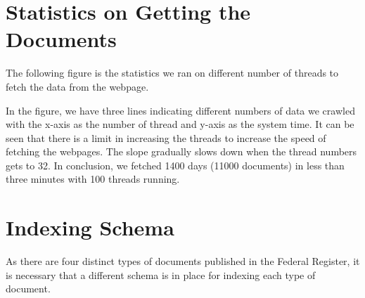 \documentclass{sig-alternate-05-2015}
\begin{document}
\section{Statistics on Getting the Documents}
The following figure is the statistics we ran on different number of threads to fetch the data from the webpage.\\



In the figure, we have three lines indicating different numbers of data we crawled with the x-axis as the number of thread and y-axis as the system time. It can be seen that there is a limit in increasing the threads to increase the speed of fetching the webpages. The slope gradually slows down when the thread numbers gets to 32. In conclusion, we fetched 1400 days (11000 documents) in less than three minutes with 100 threads running.  

\section{Indexing Schema} \label{Indexing Schema}
As there are four distinct types of documents published in the Federal Register, it is necessary that a different schema is in place for indexing each type of document. 
\end{document}
